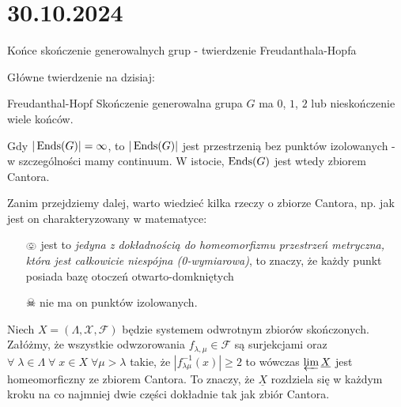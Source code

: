 \section{30.10.2024}{Końce skończenie generowalnych grup - twierdzenie Freudanthala-Hopfa}



Główne twierdzenie na dzisiaj:
\begin{theorem}{Freudanthal-Hopf}{}
  Skończenie generowalna grupa $G$ ma $0$, $1$, $2$ lub nieskończenie wiele końców.

  Gdy $|\operatorname{Ends}(G)|=\infty$, to $|\operatorname{Ends}(G)|$ jest przestrzenią bez punktów izolowanych - w szczególności mamy continuum. W istocie, $\operatorname{Ends}(G)$ jest wtedy zbiorem Cantora.
\end{theorem}

Zanim przejdziemy dalej, warto wiedzieć kilka rzeczy o zbiorze Cantora, np. jak jest on charakteryzowany w matematyce:
\begin{itemize}
  \item[$\pumpkin$] jest to {\slshape jedyna z dokładnością do homeomorfizmu przestrzeń metryczna, która jest całkowicie niespójna (0-wymiarowa)}, to znaczy, że każdy punkt posiada bazę otoczeń otwarto-domkniętych 
  \item[$\skull$] nie ma on punktów izolowanych.
\end{itemize}

Niech $X=(\Lambda, \mathcal{X}, \mathcal{F})$ będzie systemem odwrotnym zbiorów skończonych. Załóżmy, że wszystkie odwzorowania $f_{\lambda,\mu}\in\mathcal{F}$ są surjekcjami oraz $\forall\;\lambda\in\Lambda\;\forall\;x\in X\;\forall\mu>\lambda$ takie, że $|f^{-1}_{\lambda\mu}(x)|\geq 2$ to wówczas $\varprojlim \underline{X}$ jest homeomorficzny ze zbiorem Cantora. To znaczy, że $\underline{X}$ rozdziela się w każdym kroku na co najmniej dwie części dokładnie tak jak zbiór Cantora.

